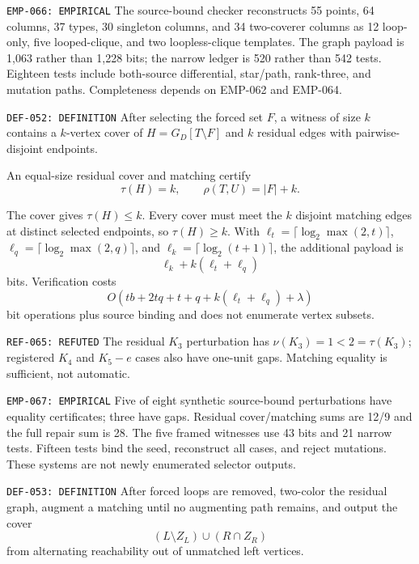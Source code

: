 \documentclass[11pt]{article}
\begin{document}
{\texttt{EMP-066: EMPIRICAL}}
The source-bound checker reconstructs 55 points, 64 columns, 37 types, 30
singleton columns, and 34 two-coverer columns as 12 loop-only, five
looped-clique, and two loopless-clique templates.  The graph payload is 1,063
rather than 1,228 bits; the narrow ledger is 520 rather than 542 tests.
Eighteen tests include both-source differential, star/path, rank-three, and
mutation paths.  Completeness depends on EMP-062 and EMP-064.

{\texttt{DEF-052: DEFINITION}}
After selecting the forced set \(F\), a witness of size \(k\) contains a
\(k\)-vertex cover of \(H=G_D[T\setminus F]\) and \(k\) residual edges with
pairwise-disjoint endpoints.

{}
An equal-size residual cover and matching certify
\[
 \tau(H)=k,\qquad \rho(T,U)=|F|+k.
\]
\begin{claimproof}
The cover gives \(\tau(H)\le k\).  Every cover must meet the \(k\) disjoint
matching edges at distinct selected endpoints, so \(\tau(H)\ge k\).
With \(\ell_t=\lceil\log_2\max(2,t)\rceil\),
\(\ell_q=\lceil\log_2\max(2,q)\rceil\), and
\(\ell_k=\lceil\log_2(t+1)\rceil\), the additional payload is
\[
 \ell_k+k(\ell_t+\ell_q)
\]
bits.  Verification costs
\[
 O(tb+2tq+t+q+k(\ell_t+\ell_q)+\lambda)
\]
bit operations plus source binding and does not enumerate vertex subsets.
\end{claimproof}

{\texttt{REF-065: REFUTED}}
The residual \(K_3\) perturbation has
\(\nu(K_3)=1<2=\tau(K_3)\); registered \(K_4\) and \(K_5-e\) cases also
have one-unit gaps.  Matching equality is sufficient, not automatic.

{\texttt{EMP-067: EMPIRICAL}}
Five of eight synthetic source-bound perturbations have equality
certificates; three have gaps.  Residual cover/matching sums are 12/9 and the
full repair sum is 28.  The five framed witnesses use 43 bits and 21 narrow
tests.  Fifteen tests bind the seed, reconstruct all cases, and reject
mutations.  These systems are not newly enumerated selector outputs.

{\texttt{DEF-053: DEFINITION}}
After forced loops are removed, two-color the residual graph, augment a
matching until no augmenting path remains, and output the cover
\[
 (L\setminus Z_L)\cup(R\cap Z_R)
\]
from alternating reachability out of unmatched left vertices.
\end{document}
